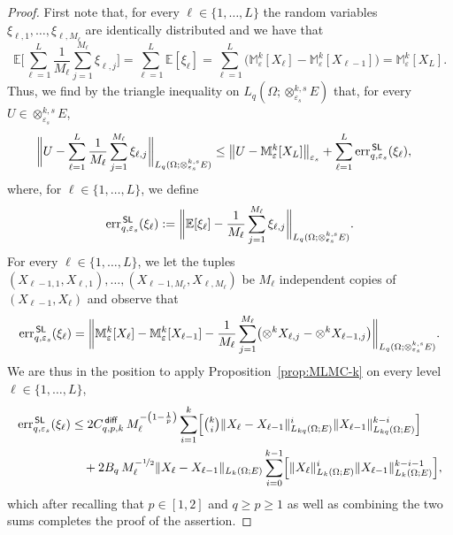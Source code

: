 \documentclass[reqno]{amsart}
\numberwithin{equation}{section}
\newcommand{\bbE}{\mathbb{E}}
\newcommand{\bbM}{\mathbb{M}}
\newcommand{\xk}{\otimes^k}
\newcommand{\xkseps}{\otimes^{k,s}_{\varepsilon_s}}
\newcommand{\tenvec}{U}
\newcommand{\Mk}{\bbM^k_\varepsilon}
\newcommand{\norm}[2]{     \| #1       \|_{ #2 }}
\newcommand{\eps}{\varepsilon}
\newcommand{\Cdiff}{C^{\,\sf diff}_{q,p,k}}
\theoremstyle{remark}
\theoremstyle{definition}
\begin{document}
\begin{proof} 
	First note that, for every $\ell\in\{1,\ldots,L\}$ 
	the random variables 
	$\xi_{\ell,1},\ldots,\xi_{\ell,M_\ell}$ 
	are identically distributed 
	and we have that 
	\[ 
	\bbE\Biggl[ 
	\sum_{\ell = 1}^{L} 
	\frac{1}{M_\ell} 
	\sum_{j=1}^{M_\ell}  
	\xi_{\ell,j} \Biggr] 
	= 
	\sum_{\ell = 1}^{L} 
	\bbE[ \xi_\ell ] 
	=
	\sum_{\ell = 1}^{L} 
	\bigl( \Mk[ X_\ell ] - \Mk[ X_{\ell-1} ] \bigr) 
	= 
	\Mk[X_L] . 
	\] 
	Thus, we find by the triangle inequality 
	on $L_q(\Omega;\xkseps E)$ that, 
	for every $\tenvec\in\xkseps E$, 
	\begin{align*} 
	\biggl\| 
	\tenvec 
	-
	\sum_{\ell = 1}^{L} 
	\frac{1}{M_\ell} 
	\sum_{j=1}^{M_\ell}  
	\xi_{\ell,j}
	\biggr\|_{L_q(\Omega;\xkseps E)} 
	&\leq 
	\bigl\| 
	\tenvec 
	-
	\Mk[ X_L ] 
	\bigr\|_{\eps_s} 
	+ 
	\sum_{\ell=1}^L 
	\mathrm{err}^{\sf\, SL}_{q,\eps_s}(\xi_\ell), 
	\end{align*}
	where, for $\ell\in\{1,\ldots,L\}$, we define  
	\[
	\mathrm{err}^{\sf\, SL}_{q,\eps_s}(\xi_\ell) 
	:= 
	\biggl\| 
	\bbE[\xi_\ell ] - 
	\frac{1}{M_\ell} 
	\sum_{j=1}^{M_\ell}  
	\xi_{\ell,j}
	\biggr\|_{L_q(\Omega;\xkseps E)} 
	. 
	\]
	For every $\ell\in\{1,\ldots,L\}$, 
	we let the tuples $(X_{\ell-1,1}, X_{\ell,1}), \ldots, 
	(X_{\ell-1,M_\ell}, X_{\ell,M_\ell})$ 
	be $M_\ell$ independent  
	copies of $(X_{\ell-1}, X_\ell)$ 
	and observe that 
	\begin{align*} 
	\mathrm{err}^{\sf\, SL}_{q,\eps_s}(\xi_\ell) 
	= 
	\biggl\| 
	\Mk[X_\ell] 
	-
	\Mk[X_{\ell-1}] 
	- 
	\frac{1}{M_\ell} 
	\sum_{j=1}^{M_\ell}
	\bigl( 
	\xk X_{\ell,j} 
	- 
	\xk X_{\ell-1,j}
	\bigr) 
	\biggr\|_{L_q(\Omega;\xkseps E)} . 
	\end{align*} 
	We are thus in the position to 
	apply Proposition~\ref{prop:MLMC-k} 
	on every level $\ell\in\{1,\ldots,L\}$, 
	\begin{align*} 
	\mathrm{err}^{\sf\, SL}_{q,\eps_s}(\xi_\ell) 
	&\leq  
	2 \Cdiff \,  
	M_\ell^{-\left( 1-\frac{1}{p} \right)} 
	\sum_{i=1}^k 
	\Bigl[ 
	{\textstyle\binom{k}{i}}
	\norm{ X_\ell - X_{\ell-1} }{L_{kq}(\Omega;E)}^i 
	\norm{ X_{\ell-1} }{L_{kq}(\Omega;E)}^{k-i} 
	\Bigr] 
	\\
	&\quad + 
	2 B_q \, 
	M_\ell^{-\nicefrac{1}{2}} 
	\norm{ X_\ell - X_{\ell-1} }{L_k(\Omega;E)} 
	\sum_{i=0}^{k-1} 
	\Bigl[ 
	\norm{ X_\ell }{L_k(\Omega;E)}^i 
	\norm{ X_{\ell-1} }{L_k(\Omega;E)}^{k-i-1} 
	\Bigr] 
	, 
	\end{align*} 
	which after recalling that 
	$p\in[1,2]$ and $q\geq p \geq 1$  
	as well as combining the two sums  
	completes the proof of the assertion. 
\end{proof} 
\end{document}
